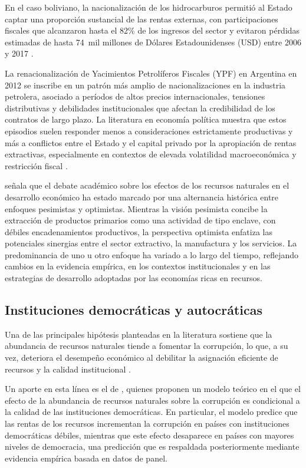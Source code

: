 \documentclass[../../TFM.tex]{subfiles}
\begin{document}
	En el caso boliviano, la nacionalización de los hidrocarburos permitió al Estado captar una proporción sustancial de las rentas externas, con participaciones fiscales que alcanzaron hasta el 82\% de los ingresos del sector y evitaron pérdidas estimadas de hasta 74~mil millones de Dólares Estadounidenses (USD) entre 2006 y 2017 \parencite{CELAG2019}.
	
	La renacionalización de Yacimientos Petrolíferos Fiscales (YPF) en Argentina en 2012 se inscribe en un patrón más amplio de nacionalizaciones en la industria petrolera, asociado a períodos de altos precios internacionales, tensiones distributivas y debilidades institucionales que afectan la credibilidad de los contratos de largo plazo. La literatura en economía política muestra que estos episodios suelen responder menos a consideraciones estrictamente productivas y más a conflictos entre el Estado y el capital privado por la apropiación de rentas extractivas, especialmente en contextos de elevada volatilidad macroeconómica y restricción fiscal \parencite{Guriev2011}.
	
	\textcite{Lebdioui2019} señala que el debate académico sobre los efectos de los recursos naturales en el desarrollo económico ha estado marcado por una alternancia histórica entre enfoques pesimistas y optimistas. Mientras la visión pesimista concibe la extracción de productos primarios como una actividad de tipo enclave, con débiles encadenamientos productivos, la perspectiva optimista enfatiza las potenciales sinergias entre el sector extractivo, la manufactura y los servicios. La predominancia de uno u otro enfoque ha variado a lo largo del tiempo, reflejando cambios en la evidencia empírica, en los contextos institucionales y en las estrategias de desarrollo adoptadas por las economías ricas en recursos.
	
	\subsection{Instituciones democráticas y autocráticas}
	\label{subsec:instituciones}
	
	Una de las principales hipótesis planteadas en la literatura sostiene que la abundancia de recursos naturales tiende a fomentar la corrupción, lo que, a su vez, deteriora el desempeño económico al debilitar la asignación eficiente de recursos y la calidad institucional \parencite{Isham2005,Sala-i-Martin2013}.
	
	Un aporte en esta línea es el de \textcite{Bhattacharyya2010}, quienes proponen un modelo teórico en el que el efecto de la abundancia de recursos naturales sobre la corrupción es condicional a la calidad de las instituciones democráticas. En particular, el modelo predice que las rentas de los recursos incrementan la corrupción en países con instituciones democráticas débiles, mientras que este efecto desaparece en países con mayores niveles de democracia, una predicción que es respaldada posteriormente mediante evidencia empírica basada en datos de panel.
	
\end{document}
